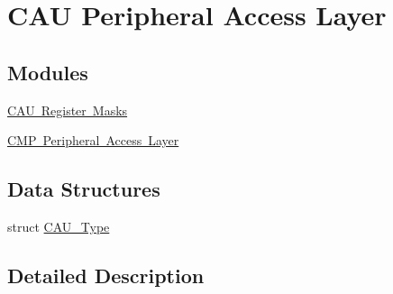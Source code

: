 \hypertarget{group___c_a_u___peripheral___access___layer}{}\section{C\+AU Peripheral Access Layer}
\label{group___c_a_u___peripheral___access___layer}
\subsection*{Modules}
\begin{DoxyCompactItemize}
\item 
\mbox{\hyperlink{group___c_a_u___register___masks}{C\+A\+U Register Masks}}
\item 
\mbox{\hyperlink{group___c_m_p___peripheral___access___layer}{C\+M\+P Peripheral Access Layer}}
\end{DoxyCompactItemize}
\subsection*{Data Structures}
\begin{DoxyCompactItemize}
\item 
struct \mbox{\hyperlink{struct_c_a_u___type}{C\+A\+U\+\_\+\+Type}}
\end{DoxyCompactItemize}


\subsection{Detailed Description}
